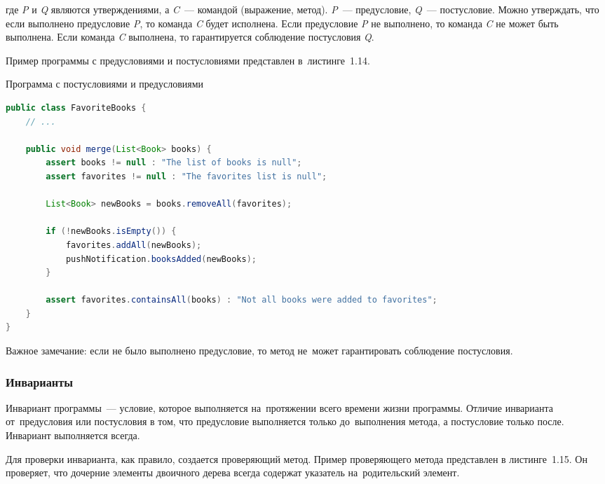где \textit{P} и \textit{Q} являются утверждениями, а \textit{C}~--- командой (выражение, метод). \textit{P}~--- предусловие, \textit{Q}~--- постусловие. Можно утверждать, что если выполнено предусловие \textit{P}, то команда \textit{C} будет исполнена. Если предусловие \textit{P} не выполнено, то команда \textit{C} не может быть выполнена. Если команда \textit{C} выполнена, то гарантируется соблюдение постусловия \textit{Q}.

Пример программы с предусловиями и постусловиями представлен в~листинге~1.14.

\begin{ListingEnv}[!h]%
	\captiondelim{ } %
	\caption{Программа с постусловиями и предусловиями}
	\begin{lstlisting}[language={Java}]
public class FavoriteBooks {
	// ...
	
	public void merge(List<Book> books) {
		assert books != null : "The list of books is null";
		assert favorites != null : "The favorites list is null";
		
		List<Book> newBooks = books.removeAll(favorites);
		
		if (!newBooks.isEmpty()) {
			favorites.addAll(newBooks);
			pushNotification.booksAdded(newBooks);
		}
		
		assert favorites.containsAll(books) : "Not all books were added to favorites";
	}
}
	\end{lstlisting}
\end{ListingEnv}%

Важное замечание: если не было выполнено предусловие, то метод не~может гарантировать соблюдение постусловия.

\subsubsection{Инварианты}	

Инвариант программы~--- условие, которое выполняется на~протяжении всего времени жизни программы. Отличие инварианта от~предусловия или постусловия в том, что предусловие выполняется только до~выполнения метода, а постусловие только после. Инвариант выполняется всегда.

Для проверки инварианта, как правило, создается проверяющий метод. Пример проверяющего метода представлен в листинге~1.15. Он проверяет, что дочерние элементы двоичного дерева всегда содержат указатель на~родительский элемент.

